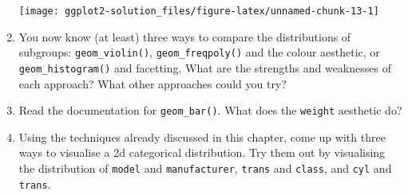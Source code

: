 \documentclass[]{book}
\begin{document}
\begin{enumerate}
  \texttt{[image: ggplot2-solution\_files/figure-latex/unnamed-chunk-13-1]}
\item
  You now know (at least) three ways to compare the distributions of
  subgroups: \texttt{geom\_violin()}, \texttt{geom\_freqpoly()} and the
  colour aesthetic, or \texttt{geom\_histogram()} and facetting. What
  are the strengths and weaknesses of each approach? What other
  approaches could you try?
\item
  Read the documentation for \texttt{geom\_bar()}. What does the
  \texttt{weight} aesthetic do?
\item
  Using the techniques already discussed in this chapter, come up with
  three ways to visualise a 2d categorical distribution. Try them out by
  visualising the distribution of \texttt{model} and
  \texttt{manufacturer}, \texttt{trans} and \texttt{class}, and
  \texttt{cyl} and \texttt{trans}.
\end{enumerate}


\end{document}
